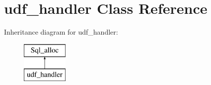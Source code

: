 \hypertarget{classudf__handler}{}\section{udf\+\_\+handler Class Reference}
\label{classudf__handler}
Inheritance diagram for udf\+\_\+handler\+:\begin{figure}[H]
\begin{center}
\leavevmode
\includegraphics[height=2.000000cm]{classudf__handler}
\end{center}
\end{figure}
